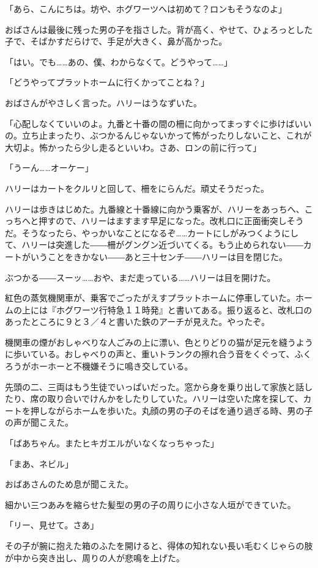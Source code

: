 \documentclass[10pt,a4paper]{article}
\begin{document}
\begin{CJK}{UTF8}{min}
「あら、こんにちは。坊や、ホグワーツへは初めて？ロンもそうなのよ」

おばさんは最後に残った男の子を指さした。背が高く、やせて、ひょろっとした子で、そばかすだらけで、手足が大きく、鼻が高かった。

「はい。でも……あの、僕、わからなくて。どうやって……」

「どうやってプラットホームに行くかってことね？」

おばさんがやさしく言った。ハリーはうなずいた。

「心配しなくていいのよ。九番と十番の間の柵に向かってまっすぐに歩けばいいの。立ち止まったり、ぶつかるんじゃないかって怖がったりしないこと、これが大切よ。怖かったら少し走るといいわ。さあ、ロンの前に行って」

「うーん……オーケー」

ハリーはカートをクルリと回して、柵をにらんだ。頑丈そうだった。

ハリーは歩きはじめた。九番線と十番線に向かう乗客が、ハリーをあっちへ、こっちへと押すので、ハリーはますます早足になった。改札口に正面衝突しそうだ。そうなったら、やっかいなことになるぞ……カートにしがみつくようにして、ハリーは突進した――柵がグングン近づいてくる。もう止められない――カートがいうことをきかない――あと三十センチ――ハリーは目を閉じた。

ぶつかる――スーッ……おや、まだ走っている……ハリーは目を開けた。

紅色の蒸気機関車が、乗客でごったがえすプラットホームに停車していた。ホームの上には『ホグワーツ行特急１１時発』と書いてある。振り返ると、改札口のあったところに９と３／４と書いた鉄のアーチが見えた。やったぞ。

機関車の煙がおしゃべりな人ごみの上に漂い、色とりどりの猫が足元を縫うように歩いている。おしゃべりの声と、重いトランクの擦れ合う音をくぐって、ふくろうがホーホーと不機嫌そうに鳴き交している。

先頭の二、三両はもう生徒でいっぱいだった。窓から身を乗り出して家族と話したり、席の取り合いでけんかをしたりしていた。ハリーは空いた席を探して、カートを押しながらホームを歩いた。丸顔の男の子のそばを通り過ぎる時、男の子の声が聞こえた。

「ばあちゃん。またヒキガエルがいなくなっちゃった」

「まあ、ネビル」

おばあさんのため息が聞こえた。

細かい三つあみを縮らせた髪型の男の子の周りに小さな人垣ができていた。

「リー、見せて。さあ」

その子が腕に抱えた箱のふたを開けると、得体の知れない長い毛むくじゃらの肢が中から突き出し、周りの人が悲鳴を上げた。


\end{CJK}
\end{document}
